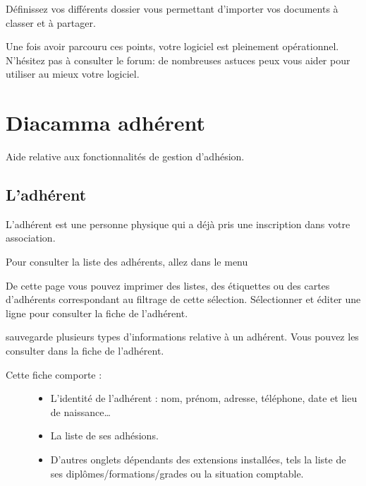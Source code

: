 \documentclass[a4paper,10pt,oneside,french]{sphinxmanual}
\begin{document}
Définissez vos différents dossier vous permettant d’importer vos documents à classer et à partager.

Une fois avoir parcouru ces points, votre logiciel  est pleinement opérationnel.
N’hésitez pas à consulter le forum: de nombreuses astuces peux vous aider pour utiliser au mieux votre logiciel.


\chapter{Diacamma adhérent}
\label{\detokenize{member/index:diacamma-adherent}}\label{\detokenize{member/index::doc}}
Aide relative aux fonctionnalités de gestion d’adhésion.


\section{L’adhérent}
\label{\detokenize{member/member:ladherent}}\label{\detokenize{member/member::doc}}
L’adhérent est une personne physique qui a déjà pris une inscription dans votre association.

Pour consulter la liste des adhérents, allez dans le menu 

\noindent{}

De cette page vous pouvez imprimer des listes, des étiquettes ou des cartes d’adhérents correspondant au filtrage de cette sélection.
Sélectionner et éditer une ligne pour consulter la fiche de l’adhérent.

 sauvegarde plusieurs types d’informations relative à un adhérent. Vous pouvez les consulter dans la fiche de l’adhérent.

\noindent{}
\begin{description}
\item[{Cette fiche comporte :}] \leavevmode\begin{itemize}
\item {} 
L’identité de l’adhérent : nom, prénom, adresse, téléphone, date et lieu de naissance…

\item {} 
La liste de ses adhésions.

\item {} 
D’autres onglets dépendants des extensions installées, tels la liste de ses diplômes/formations/grades ou la situation comptable.

\end{itemize}

\end{description}
\end{document}
